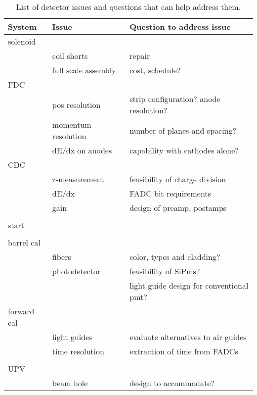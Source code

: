\documentclass[12pt,dvips]{article}
\begin{document}
\begin{table}[htb] 
\caption{List of detector issues and questions that can help address them. }
\begin{center}
\begin{tabular}{|l|l|l|}\hline \hline

System      & Issue   & Question to address issue \\ \hline \hline
solenoid    &         &                           \\
            & coil shorts & repair \\
            & full scale assembly & cost, schedule?  \\\hline
FDC         &         &                           \\
            & pos resolution & strip configuration? anode resolution? \\
            & momentum resolution & number of planes and spacing? \\
            & dE/dx on anodes & capability with cathodes alone? \\\hline
CDC         &         &                           \\
            &z-measurement        & feasibility of charge division  \\
            & dE/dx &  FADC bit requirements\\
            & gain & design of preamp, postamps \\
            &  &  \\\hline
start       &         &                           \\
            &  &  \\\hline
barrel cal  &         &                           \\
            & fibers & color, types and cladding? \\
            & photodetector & feasibility of SiPms? \\
            &               & light guide design for conventional pmt? \\\hline
forward cal &         &                           \\
            & light guides & evaluate alternatives to air guides \\
            & time resolution & extraction of time from FADCs\\
            &  &  \\\hline
UPV         &         &                           \\
            & beam hole & design to accommodate? \\

\hline \hline
\end{tabular}
\label{tab:thscat}
\end{center}
\end{table} 
\end{document}
